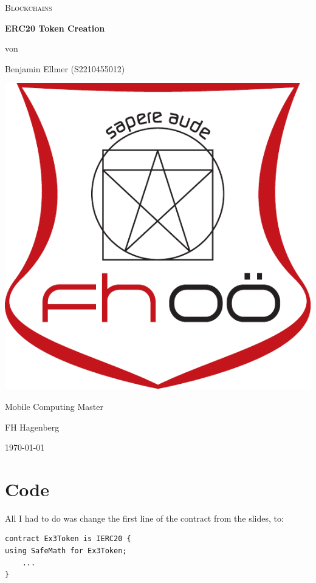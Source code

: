 \documentclass[14pt,a4paper]{extarticle}
\begin{document}
	\begin{titlepage}
		\centering
		{\scshape\LARGE Blockchains \par}
		\vspace{2.5cm}
		{\huge\bfseries ERC20 Token Creation}
		\vfill
		{\normalsize von\par}
		{\normalsize Benjamin Ellmer (\textsc{S2210455012}) \par}
		\vspace{1cm}
		\includegraphics[width=0.3\textheight]{images/logo.pdf} \par
		\vspace{1cm}
		{\large Mobile Computing Master \par}
		{\large FH Hagenberg \par}
		\vfill
		{\large \today\par}
	\end{titlepage}

	\section{Code}
	All I had to do was change the first line of the contract from the slides, to:
	\begin{lstlisting}
contract Ex3Token is IERC20 { 
using SafeMath for Ex3Token;
	...
}
	\end{lstlisting}
	
\end{document}

